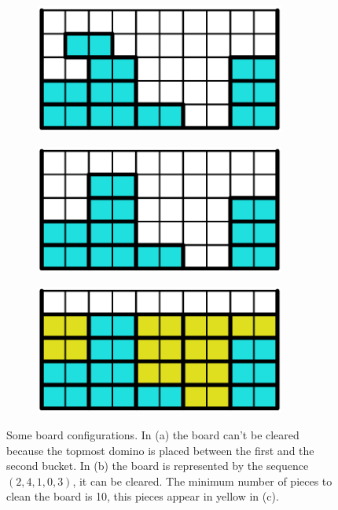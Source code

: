 \begin{figure}[ht]
  \centering
  \begin{subfigure}[b]{0.3\textwidth}
    \centering
    \includegraphics[width=0.9\textwidth]{pictures/dominoes/horitzonatl_configuration_1.pdf}
    \caption{}
  \end{subfigure}
  \begin{subfigure}[b]{0.3\textwidth}
    \centering
    \includegraphics[width=0.9\textwidth]{pictures/dominoes/horitzonatl_configuration_2.pdf}
    \caption{}
  \end{subfigure}
  \begin{subfigure}[b]{0.3\textwidth}
    \centering
    \includegraphics[width=0.9\textwidth]{pictures/dominoes/horitzonatl_configuration_3.pdf}
    \caption{}
  \end{subfigure}
  \caption{Some board configurations. In (a) the board can't be cleared because the topmost domino is placed between the first and the second bucket. In (b) the board is represented by the sequence $(2,4,1,0,3)$, it can be cleared. The minimum number of pieces to clean the board is 10, this pieces appear in yellow in (c).}
  \label{dom:horitzonatl_configuration}
\end{figure}

